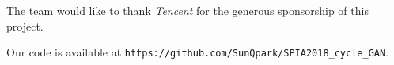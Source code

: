 The team would like to thank \emph{Tencent} for the generous sponsorship of this project. 




Our code is available at \texttt{https://github.com/SunQpark/SPIA2018\_cycle\_GAN}.




\endinput




